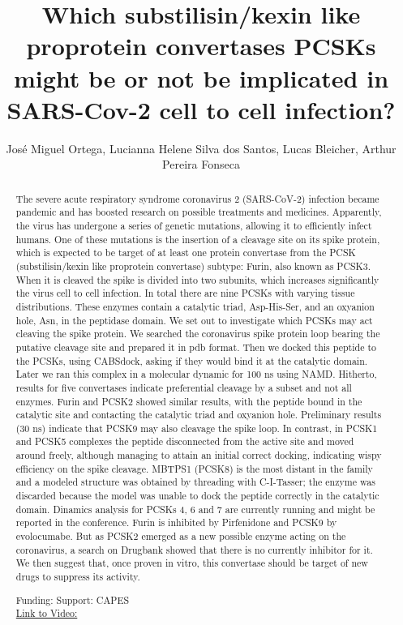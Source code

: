 \documentclass[twoside]{article}
\title{\vspace{-15mm}\fontsize{24pt}{10pt}\selectfont\textbf{ Which substilisin/kexin like proprotein convertases PCSKs might be or not be implicated in SARS-Cov-2 cell to cell infection? }} %
\author{ Jos\'e Miguel Ortega,  Lucianna Helene Silva dos Santos,  Lucas Bleicher,  Arthur Pereira Fonseca }
\affil{ UNIVERSIDADE FEDERAL DE MINAS GERAIS,  IOC/Fiocruz,  UFMG,  UNIVERSIDADE FEDERAL DE MINAS GERAIS }
\date{}
\begin{document}
  
  
  \maketitle %
  
  
  \thispagestyle{fancy} %
  
  
  \begin{abstract}
  The severe acute respiratory syndrome coronavirus 2 (SARS-CoV-2) infection became pandemic and has boosted research on possible treatments and medicines. Apparently,  the virus has undergone a series of genetic mutations,  allowing it to efficiently infect humans. One of these mutations is the insertion of a cleavage site on its spike protein,  which is expected to be target of at least one protein convertase from the PCSK (substilisin/kexin like proprotein convertase) subtype: Furin,  also known as PCSK3. When it is cleaved the spike is divided into two subunits,  which increases significantly the virus cell to cell infection. In total there are nine PCSKs with varying tissue distributions. These enzymes contain a catalytic triad,  Asp-His-Ser,  and an oxyanion hole,  Asn,  in the peptidase domain. 
We set out to investigate which PCSKs may act cleaving the spike protein. We searched the coronavirus spike protein loop bearing the putative cleavage site and prepared it in pdb format. Then we docked this peptide to the PCSKs,  using CABSdock,  asking if they would bind it at the catalytic domain. Later we ran this complex in a molecular dynamic for 100 ns using NAMD.
Hitherto,  results for five convertases indicate preferential cleavage by a subset and not all enzymes. Furin and PCSK2 showed similar results,  with the peptide bound in the catalytic site and contacting the catalytic triad and oxyanion hole. Preliminary results (30 ns) indicate that PCSK9 may also cleavage the spike loop. In contrast,  in PCSK1 and PCSK5 complexes the peptide disconnected from the active site and moved around freely,  although managing to attain an initial correct docking,  indicating wispy efficiency on the spike cleavage. MBTPS1 (PCSK8) is the most distant in the family and a modeled structure was obtained by threading with C-I-Tasser; the enzyme was discarded because the model was unable to dock the peptide correctly in the catalytic domain. Dinamics analysis for PCSKs 4,  6 and 7 are currently running and might be reported in the conference. Furin is inhibited by Pirfenidone and PCSK9 by evolocumabe. But as PCSK2 emerged as a new possible enzyme acting on the coronavirus,  a search on Drugbank showed that there is no currently inhibitor for it. We then suggest that,  once proven in vitro,  this convertase should be target of new drugs to suppress its activity.
  
  Funding: Support: CAPES \\
  \href{http://ab3c.org.br/xpress_pres2020/xmxp2020-303067.html}{Link to Video:}

  \end{abstract}
   
  
\end{document}
